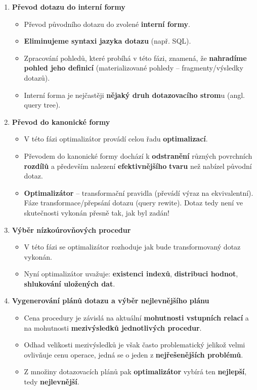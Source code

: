 \begin{enumerate}
	\item \textbf{Převod dotazu do interní formy}
	\begin{itemize}
		\item Převod původního dotazu do zvolené \textbf{interní formy}.
		\item \textbf{Eliminujeme syntaxi jazyka dotazu} (např. SQL).
		\item Zpracování pohledů, které probíhá v této fázi, znamená, že \textbf{nahradíme pohled jeho definicí} (materializované pohledy -- fragmenty/výsledky dotazů).
		\item Interní forma je nejčastěji \textbf{nějaký druh dotazovacího strom}u (angl. query tree).
	\end{itemize}
	\item \textbf{Převod do kanonické formy}
	\begin{itemize}
		\item V této fázi optimalizátor provádí celou řadu \textbf{optimalizací}.
		\item Převodem do kanonické formy dochází k \textbf{odstranění} různých povrchních \textbf{rozdílů} a především nalezení \textbf{efektivnějšího} \textbf{tvaru} než nabízel původní dotaz.
		\item \textbf{Optimalizátor} – transformační pravidla (převádí výraz na ekvivalentní). Fáze transformace/přepsání dotazu (query rewite). Dotaz tedy není ve skutečnosti vykonán přesně tak, jak byl zadán! 
	\end{itemize}
	\item \textbf{Výběr nízkoúrovňových procedur}
	\begin{itemize}
		\item V této fázi se optimalizátor rozhoduje jak bude transformovaný dotaz vykonán.
		\item Nyní optimalizátor uvažuje: \textbf{existenci indexů}, \textbf{distribuci hodnot}, \textbf{shlukování uložených dat}.
	\end{itemize}
	\item \textbf{Vygenerování plánů dotazu a výběr nejlevnějšího plánu}
	\begin{itemize}
		\item Cena procedury je závislá na aktuální \textbf{mohutnosti vstupních relací} a na mohutnosti \textbf{mezivýsledků jednotlivých procedur}.
		\item Odhad velikosti mezivýsledků je však často problematický jelikož velmi ovlivňuje cenu operace, jedná se o jeden z \textbf{nejřešenějších problémů}.
		\item Z množiny dotazovacích plánů pak \textbf{optimalizátor} vybírá ten \textbf{nejlepší}, tedy \textbf{nejlevnější}.
	\end{itemize}
\end{enumerate}

